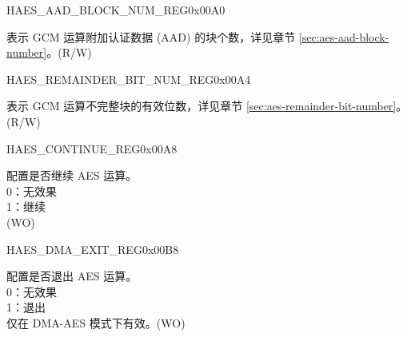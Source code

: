 \begin{register}{H}{AES\_AAD\_BLOCK\_NUM\_REG}{0x00A0}\label{regdesc:AESAADBLOCKNUMREG}
%
\regnewline%
\begin{regdesc}\begin{reglist}
\item [AES\_AAD\_BLOCK\_NUM] 表示 GCM 运算附加认证数据 (AAD) 的块个数，详见章节 \ref{sec:aes-aad-block-number}。(R/W)
\end{reglist}\end{regdesc}
\end{register}


\begin{register}{H}{AES\_REMAINDER\_BIT\_NUM\_REG}{0x00A4}\label{regdesc:AESREMAINDERBITNUMREG}
%
%
\regnewline%
\begin{regdesc}\begin{reglist}
\item [AES\_REMAINDER\_BIT\_NUM] 表示 GCM 运算不完整块的有效位数，详见章节 \ref{sec:aes-remainder-bit-number}。(R/W)
\end{reglist}\end{regdesc}
\end{register}


\begin{register}{H}{AES\_CONTINUE\_REG}{0x00A8}\label{regdesc:AESCONTINUEREG}
%
%
\regnewline%
\begin{regdesc}\begin{reglist}
\item [AES\_CONTINUE\_REG] 配置是否继续 AES 运算。\\
0：无效果\\
1：继续 \\ (WO)
\end{reglist}\end{regdesc}
\end{register}


\begin{register}{H}{AES\_DMA\_EXIT\_REG}{0x00B8}\label{regdesc:AESDMAEXITREG}
%
%
\regnewline%
\begin{regdesc}\begin{reglist}
\item [AES\_DMA\_EXIT] 配置是否退出 AES 运算。\\
0：无效果\\
1：退出\\
仅在 DMA-AES 模式下有效。(WO)
\end{reglist}\end{regdesc}
\end{register}


